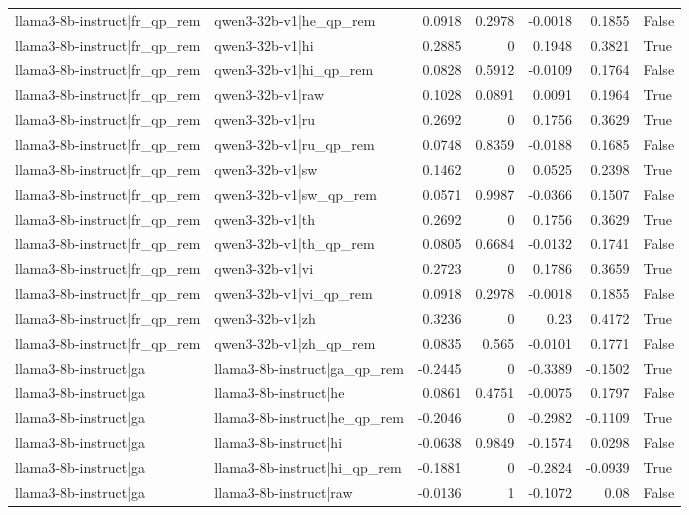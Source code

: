 \begin{table}
\begin{tabular}{l l r r r r l}
llama3-8b-instruct|fr_qp_rem & qwen3-32b-v1|he_qp_rem & 0.0918 & 0.2978 & -0.0018 & 0.1855 & False \\
llama3-8b-instruct|fr_qp_rem & qwen3-32b-v1|hi & 0.2885 & 0 & 0.1948 & 0.3821 & True \\
llama3-8b-instruct|fr_qp_rem & qwen3-32b-v1|hi_qp_rem & 0.0828 & 0.5912 & -0.0109 & 0.1764 & False \\
llama3-8b-instruct|fr_qp_rem & qwen3-32b-v1|raw & 0.1028 & 0.0891 & 0.0091 & 0.1964 & True \\
llama3-8b-instruct|fr_qp_rem & qwen3-32b-v1|ru & 0.2692 & 0 & 0.1756 & 0.3629 & True \\
llama3-8b-instruct|fr_qp_rem & qwen3-32b-v1|ru_qp_rem & 0.0748 & 0.8359 & -0.0188 & 0.1685 & False \\
llama3-8b-instruct|fr_qp_rem & qwen3-32b-v1|sw & 0.1462 & 0 & 0.0525 & 0.2398 & True \\
llama3-8b-instruct|fr_qp_rem & qwen3-32b-v1|sw_qp_rem & 0.0571 & 0.9987 & -0.0366 & 0.1507 & False \\
llama3-8b-instruct|fr_qp_rem & qwen3-32b-v1|th & 0.2692 & 0 & 0.1756 & 0.3629 & True \\
llama3-8b-instruct|fr_qp_rem & qwen3-32b-v1|th_qp_rem & 0.0805 & 0.6684 & -0.0132 & 0.1741 & False \\
llama3-8b-instruct|fr_qp_rem & qwen3-32b-v1|vi & 0.2723 & 0 & 0.1786 & 0.3659 & True \\
llama3-8b-instruct|fr_qp_rem & qwen3-32b-v1|vi_qp_rem & 0.0918 & 0.2978 & -0.0018 & 0.1855 & False \\
llama3-8b-instruct|fr_qp_rem & qwen3-32b-v1|zh & 0.3236 & 0 & 0.23 & 0.4172 & True \\
llama3-8b-instruct|fr_qp_rem & qwen3-32b-v1|zh_qp_rem & 0.0835 & 0.565 & -0.0101 & 0.1771 & False \\
llama3-8b-instruct|ga & llama3-8b-instruct|ga_qp_rem & -0.2445 & 0 & -0.3389 & -0.1502 & True \\
llama3-8b-instruct|ga & llama3-8b-instruct|he & 0.0861 & 0.4751 & -0.0075 & 0.1797 & False \\
llama3-8b-instruct|ga & llama3-8b-instruct|he_qp_rem & -0.2046 & 0 & -0.2982 & -0.1109 & True \\
llama3-8b-instruct|ga & llama3-8b-instruct|hi & -0.0638 & 0.9849 & -0.1574 & 0.0298 & False \\
llama3-8b-instruct|ga & llama3-8b-instruct|hi_qp_rem & -0.1881 & 0 & -0.2824 & -0.0939 & True \\
llama3-8b-instruct|ga & llama3-8b-instruct|raw & -0.0136 & 1 & -0.1072 & 0.08 & False \\

\end{tabular}
\end{table}

